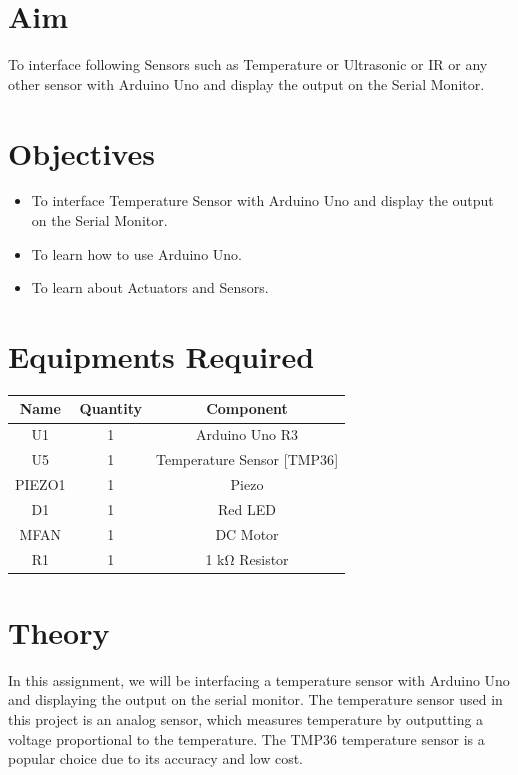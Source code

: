 \documentclass[11pt]{article}
\begin{document}
\tableofcontents
\thispagestyle{empty}
\clearpage

\setcounter{page}{1}

\section{Aim}
To interface following Sensors such as Temperature or Ultrasonic or IR or any other sensor with Arduino Uno and display the output on the Serial Monitor.
\section{Objectives}
\begin{itemize}
	\item To interface Temperature Sensor with Arduino Uno and display the output on the Serial Monitor.
	\item To learn how to use Arduino Uno.
	\item To learn about Actuators and Sensors.
\end{itemize}
\section{Equipments Required}
\begin{table}[H]
	\begin{tabular}{|c|c|c|}
		\hline
		\textbf{Name} & \textbf{Quantity} & \textbf{Component}             \\ \hline
		U1            & 1                 & Arduino Uno R3                 \\ \hline
		U5            & 1                 & Temperature Sensor {[}TMP36{]} \\ \hline
		PIEZO1        & 1                 & Piezo                          \\ \hline
		D1            & 1                 & Red LED                        \\ \hline
		MFAN          & 1                 & DC Motor                       \\ \hline
		R1            & 1                 & 1 kΩ Resistor                  \\ \hline
	\end{tabular}
\end{table}

\section{Theory}
In this assignment, we will be interfacing a temperature sensor with Arduino Uno and displaying the output on the serial monitor. The temperature sensor used in this project is an analog sensor, which measures temperature by outputting a voltage proportional to the temperature. The TMP36 temperature sensor is a popular choice due to its accuracy and low cost.\\
\end{document}
